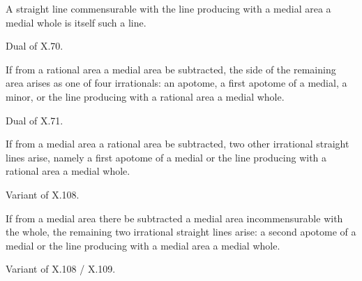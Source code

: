 \documentclass{rrxiv}
\begin{document}
\begin{claim}
\label{prop:X.107}
A straight line commensurable with the line producing with a medial
area a medial whole is itself such a line.
\end{claim}
\begin{evidence}[Proof of X.107]
\label{ev:X.107}
Dual of X.70.
\end{evidence}

\begin{claim}
\label{prop:X.108}
If from a rational area a medial area be subtracted, the side of the
remaining area arises as one of four irrationals: an apotome, a
first apotome of a medial, a minor, or the line producing with a
rational area a medial whole.
\end{claim}
\begin{evidence}[Proof of X.108]
\label{ev:X.108}
Dual of X.71.
\end{evidence}

\begin{claim}
\label{prop:X.109}
If from a medial area a rational area be subtracted, two other
irrational straight lines arise, namely a first apotome of a medial
or the line producing with a rational area a medial whole.
\end{claim}
\begin{evidence}[Proof of X.109]
\label{ev:X.109}
Variant of X.108.
\end{evidence}

\begin{claim}
\label{prop:X.110}
If from a medial area there be subtracted a medial area
incommensurable with the whole, the remaining two irrational straight
lines arise: a second apotome of a medial or the line producing with
a medial area a medial whole.
\end{claim}
\begin{evidence}[Proof of X.110]
\label{ev:X.110}
Variant of X.108 / X.109.
\end{evidence}
\end{document}
